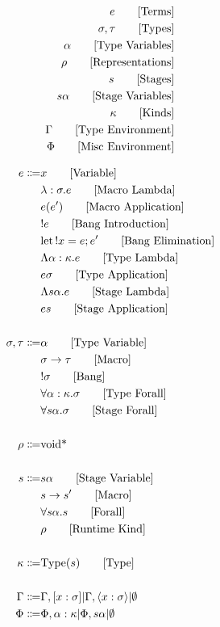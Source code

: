 \documentclass {article}
\begin{document}
\Large

\begin{align*}
e \tag* {[Terms]}\\
\sigma, \tau \tag* {[Types]} \\
\alpha \tag* {[Type Variables]} \\
\rho \tag* {[Representations]} \\
s \tag* {[Stages]} \\
s \alpha \tag* {[Stage Variables]} \\
\kappa \tag* {[Kinds]} \\
\Gamma \tag* {[Type Environment]} \\
\Phi \tag* {[Misc Environment]}
\end{align*}

\begin{align*}
e \Coloneqq & x \tag*{[Variable]}\\
& \lambda : \sigma. e \tag*{[Macro Lambda]}\\
& e(e') \tag*{[Macro Application]}\\
& !e \tag*{[Bang Introduction]} \\
& \text{let} \, !x = e; e' \tag*{[Bang Elimination]} \\ 
& \Lambda \alpha : \kappa. e \tag*{[Type Lambda]} \\
& e \sigma \tag*{[Type Application]} \\
& \Lambda s \alpha. e \tag*{[Stage Lambda]} \\
& e s \tag*{[Stage Application]} \\
\\
\sigma, \tau \Coloneqq & \alpha \tag* {[Type Variable]}\\
& \sigma \to \tau \tag*{[Macro]}\\
& !\sigma \tag*{[Bang]} \\
& \forall \alpha : \kappa. \sigma \tag*{[Type Forall]}\\ 
& \forall s \alpha. \sigma \tag*{[Stage Forall]}\\
\\
\rho \Coloneqq & \text{void*}\\
\\
s \Coloneqq & s \alpha \tag*{[Stage Variable]}\\
& s \to s' \tag*{[Macro]} \\
& \forall s \alpha. s \tag*{[Forall]}\\
& \rho \tag*{[Runtime Kind]}\\
\\
\kappa \Coloneqq & \text{Type} (s) \tag*{[Type]}\\
\\
\Gamma \Coloneqq & \Gamma, [x : \sigma] | \Gamma, \langle x : \sigma \rangle | \emptyset \\
\Phi \Coloneqq & \Phi, \alpha : \kappa | \Phi, s \alpha |  \emptyset \\
\end{align*}
\end{document}
